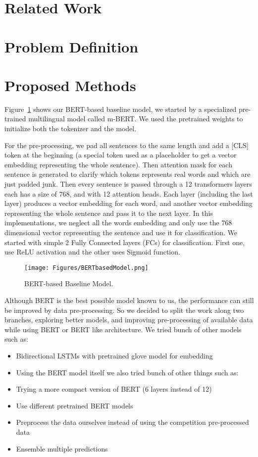\documentclass[10pt,twocolumn,letterpaper]{article}
\begin{document}
\section{Related Work}
\section{Problem Definition}
\section{Proposed Methods}
Figure~\ref{BERTbasedModel} shows our BERT-based\cite{devlin2018bert} baseline model, we started by a specialized pre-trained multilingual model called m-BERT. We used the pretrained weights to initialize both the tokenizer and the model.

For the pre-processing, we pad all sentences to the same length and add a [CLS] token at the beginning (a special token used as a placeholder to get a vector embedding representing the whole sentence). Then attention mask for each sentence is generated to clarify which tokens represents real words and which are just padded junk. Then every sentence is passed through a 12 transformers layers each has a size of 768, and with 12 attention heads. Each layer (including the last layer) produces a vector embedding for each word, and another vector embedding representing the whole sentence and pass it to the next layer. In this implementations, we neglect all the words embedding and only use the 768 dimensional vector representing the sentence and use it for classification. We started with simple 2 Fully Connected layers (FCs) for classification. First one, use ReLU activation and the other uses Sigmoid function. 

\begin{figure}[htbp]
\centerline{\texttt{[image: Figures/BERTbasedModel.png]}}
\caption{BERT-based Baseline Model.}
\label{BERTbasedModel}
\end{figure}

Although BERT is the best possible model known to us, the performance can still be improved by data pre-processing.
So we decided to split the work along two branches, exploring better models, and improving pre-processing of available data while using BERT or BERT like architecture.
We tried bunch of other models such as:
\begin{itemize}
\item Bidirectional LSTMs with pretrained glove model for embedding
\item Using the BERT model itself we also tried bunch of other things such as:
\item Trying a more compact version of BERT (6 layers instead of 12) 
\item Use different pretrained BERT models 
\item Preprocess the data ourselves instead of using the competition pre-processed data
\item Ensemble multiple predictions
\end{itemize}
\end{document}
